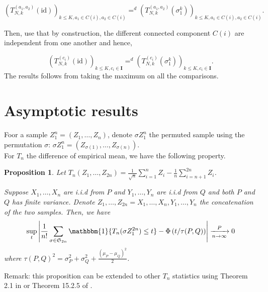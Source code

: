 \documentclass{article}
\theoremstyle{plain}
\newtheorem{Proposition}{Proposition}
\theoremstyle{remark}
\renewcommand{\S}{\mathfrak{S}}
\newcommand{\1}{\mathbbm{1}}
\newcommand{\id}{\mathrm{id}}
\newcommand{\todoT}[1]{\todo[inline,color=blue!40]{{\textbf{T:}~}#1}}
\numberwithin{equation}{section}
\begin{document}
$$(T_{N,k}^{(a_1,a_2)}(\id))_{ k\le K, a_1 \in C(i), a_2 \in C(i)}=^d(T_{N,k}^{(a_1,a_2)}(\sigma_1^k))_{ k\le K, a_1 \in C(i), a_2 \in C(i)}.$$

Then, use that by construction, the different connected component $C(i)$ are independent from one another and hence, 

$$(T_{N,k}^{(c_i)}(\id))_{ k\le K, c_i \in \textbf{I}}=^d(T_{N,k}^{(c_i)}(\sigma_1^k))_{ k\le K,  c_i \in \textbf{I}}.$$
The results follows from taking the maximum on all the comparisons.

\section{Asymptotic results}
\todoT{Change notations}

Foor a sample $Z_1^n=(Z_1,\dots,Z_n)$, denote $\sigma Z_1^n$ the permuted sample using the permutation $\sigma$: $\sigma Z_1^n=(Z_{\sigma(1)},\dots,Z_{\sigma(n)})$.\\
For $T_n$ the difference of empirical mean, we have the following property.

\begin{Proposition}\label{prop:asym_perm_test}
Let $T_n(Z_1,\dots,Z_{2n})=\frac{1}{\sqrt{n}}\sum_{i=1}^n Z_i -\frac{1}{n}\sum_{i=n+1}^{2n} Z_i$.

Suppose $X_1,\dots,X_n$ are i.i.d from $P$ and $Y_1,\dots,Y_n$ are i.i.d from $Q$ and both $P$ and $Q$ has finite variance. Denote $Z_1,\dots,Z_{2n}=X_1,\dots,X_n, Y_1,\dots,Y_n$ the concatenation of the two samples. Then, we have
$$\sup_{t}\left|\frac{1}{n!}\sum_{\sigma \in \S_{2n}} \1\{T_n(\sigma Z_{1}^{2n}) \le t\}- \Phi\left(t/\tau(P,Q) \right)\right|\xrightarrow[n \to \infty]{P} 0$$
where $\tau(P,Q)^2=\sigma_P^2+\sigma_Q^2+\frac{(\mu_P- \mu_Q)^2}{2} $.
\end{Proposition}
Remark: this proposition can be extended to other $T_n$ statistics using Theorem 2.1 in \cite{Chung_2013} or Theorem 15.2.5 of \cite{lehmann2005testing}.
\end{document}

